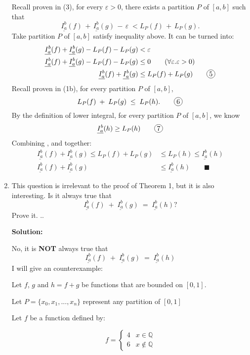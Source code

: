 \documentclass[12pt]{exam}
\newcommand*\circled[1]{\tikz[baseline=(char.base)]{
    \node[shape=circle, draw, inner sep=1pt, 
        minimum height=12pt] (char) {#1};}}
\newcommand{\Q}{\mathbb{Q}}
\newcommand{\e}{\varepsilon}
\begin{document}
\begin{enumerate}
	Recall proven in (3), for every $\e>0$, there exists a partition $P$ of $[a,b]$ such that
	$$
		\underline{I_a^b}(f) \, + \, \underline{I_a^b}(g) \, - \, \e \; < L_P(f) \, + \, L_P(g).
	$$
	Take partition $P$ of $[a,b]$ satisfy inequality above.
	It can be turned into:
	\begin{align*}
	    \underline{I_a^b}(f)+\underline{I_a^b}(g)-L_P(f)-L_P(g)&<\e\\
	    \underline{I_a^b}(f)+\underline{I_a^b}(g)-L_P(f)-L_P(g)&\leq 0\qquad( \forall \e. \e>0)\\
	    \underline{I_a^b}(f)+\underline{I_a^b}(g)&\leq L_P(f)+L_P(g)\qquad\circled{5}
	\end{align*}
	Recall proven in (1b), for every partition $P$ of $[a,b]$,
	$$
	    L_{P}(f) \; + \; L_P(g) \; \leq \; L_P(h).\qquad\circled{6}
	$$
	By the definition of lower integral, for every partition $P$ of $[a,b]$, we know
	$$
	    \underline{I_a^b}(h)\geq L_{P}(h)\qquad\circled{7}
	$$
	Combining \circled{5}, \circled{6} and \circled{7} together:
	\begin{align*}
	    \underline{I_a^b}(f)+\underline{I_a^b}(g)\leq L_P(f)+L_P(g)&\leq L_P(h)\leq\underline{I_a^b}(h)\\
	    \underline{I_a^b}(f)+\underline{I_a^b}(g)&\leq \underline{I_a^b}(h)\qquad\blacksquare
	\end{align*}

	\newpage


\item  This question is irrelevant to the proof of Theorem 1, but it is also interesting.  Is it always true that 
	$$
		\underline{I_a^b}(f) \; + \; \underline{I_a^b}(g) \; = \; \underline{I_a^b}(h)  ?
	$$
	Prove it.
	..
	
	
	\textbf{Solution:}
	
	No, it is \textbf{NOT} always true that
	$$
		\underline{I_a^b}(f) \; + \; \underline{I_a^b}(g) \; = \; \underline{I_a^b}(h)
	$$
	I will give an counterexample:
	
	Let $f$, $g$ and $h=f+g$ be functions that are bounded on $[0,1]$.
	
	Let $P=\{x_0,x_1,...,x_n\}$ represent any partition of $[0,1]$
	
	Let $f$ be a function defined by:
	
	\[
	    f = 
	    \begin{cases}
	        4 & x \in \Q \\
	        6 & x \notin \Q
	    \end{cases}
	\]
	

\end{enumerate}
\end{document}
